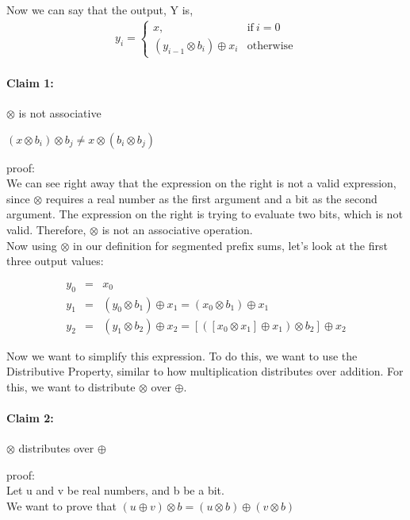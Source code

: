 \documentclass[11pt]{article}
\begin{document}
Now we can say that the output, Y is,\
  \begin{eqnarray*}
    y_i =
    \begin{cases}
      x, & \text{if}\ i = 0 \\
      (y_{i-1} \otimes b_i) \oplus x_i & \text{otherwise}
    \end{cases}
  \end{eqnarray*}

\paragraph{Claim 1:} $\otimes$ is not associative

$(x \otimes b_i) \otimes b_j \neq x \otimes (b_i \otimes b_j)$

proof:\\
We can see right away that the expression on the right is not a valid expression, since $\otimes$ requires a real number as the first argument and a bit as the second argument. The expression on the right is trying to evaluate two bits, which is not valid. Therefore, $\otimes$ is not an associative operation.\\


Now using $\otimes$ in our definition for segmented prefix sums, let’s look at the first three output values:

  \begin{eqnarray*}
    y_0 &=& x_0\\
    y_1 &=& (y_0 \otimes b_1) \oplus x_1 = (x_0 \otimes b_1) \oplus x_1\\
    y_2 &=& (y_1 \otimes b_2) \oplus x_2 = [([x_0 \otimes x_1] \oplus x_1) \otimes b_2] \oplus x_2
  \end{eqnarray*}

Now we want to simplify this expression. To do this, we want to use the Distributive Property, similar to how multiplication distributes over addition. For this, we want to distribute $\otimes$ over $\oplus$.

\paragraph{Claim 2:} $\otimes$ distributes over $\oplus$

proof:\\

Let u and v be real numbers, and b be a bit.\\
We want to prove that $(u \oplus v) \otimes b = (u \otimes b) \oplus (v \otimes b)$
\end{document}
